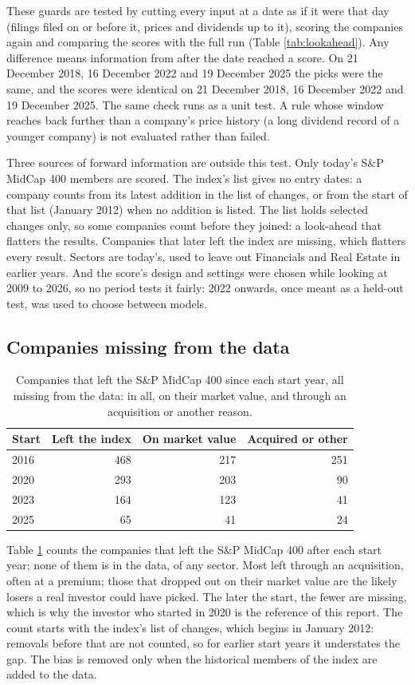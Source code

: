 \documentclass[11pt,a4paper]{article}
\begin{document}
These guards are tested by cutting every input at a date as if it were that day (filings filed on or before it, prices and dividends up to it), scoring the companies again and comparing the scores with the full run (Table \ref{tab:lookahead}). Any difference means information from after the date reached a score. On 21 December 2018, 16 December 2022 and 19 December 2025 the picks were the same, and the scores were identical on 21 December 2018, 16 December 2022 and 19 December 2025. The same check runs as a unit test. A rule whose window reaches back further than a company's price history (a long dividend record of a younger company) is not evaluated rather than failed.

Three sources of forward information are outside this test. Only today's S\&P MidCap 400 members are scored. The index's list gives no entry dates: a company counts from its latest addition in the list of changes, or from the start of that list (January 2012) when no addition is listed. The list holds selected changes only, so some companies count before they joined: a look-ahead that flatters the results. Companies that later left the index are missing, which flatters every result. Sectors are today's, used to leave out Financials and Real Estate in earlier years. And the score's design and settings were chosen while looking at 2009 to 2026, so no period tests it fairly: 2022 onwards, once meant as a held-out test, was used to choose between models.

\subsection{Companies missing from the data}
\begin{table}[H]
\centering
\small
\caption{Companies that left the S\&P MidCap 400 since each start year, all missing from the data: in all, on their market value, and through an acquisition or another reason.}\label{tab:survivors}
\begin{tabular}{l r r r}
\hline
Start & Left the index & On market value & Acquired or other \\
\hline
2016 & 468 & 217 & 251 \\
2020 & 293 & 203 & 90 \\
2023 & 164 & 123 & 41 \\
2025 & 65 & 41 & 24 \\
\hline
\end{tabular}
\end{table}
Table \ref{tab:survivors} counts the companies that left the S\&P MidCap 400 after each start year; none of them is in the data, of any sector. Most left through an acquisition, often at a premium; those that dropped out on their market value are the likely losers a real investor could have picked. The later the start, the fewer are missing, which is why the investor who started in 2020 is the reference of this report. The count starts with the index's list of changes, which begins in January 2012: removals before that are not counted, so for earlier start years it understates the gap. The bias is removed only when the historical members of the index are added to the data.
\end{document}
